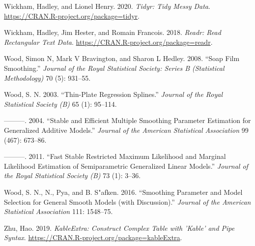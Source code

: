 \documentclass[conference,final,]{IEEEtran}
\newlength{\cslhangindent}
\newenvironment{cslreferences}%
  {\setlength{\parindent}{0pt}%
  \everypar{\setlength{\hangindent}{\cslhangindent}}\ignorespaces}%
  {\par}
\begin{document}
\begin{cslreferences}
\leavevmode\hypertarget{ref-R-tidyr}{}%
Wickham, Hadley, and Lionel Henry. 2020. \emph{Tidyr: Tidy Messy Data}. \url{https://CRAN.R-project.org/package=tidyr}.

\leavevmode\hypertarget{ref-R-readr}{}%
Wickham, Hadley, Jim Hester, and Romain Francois. 2018. \emph{Readr: Read Rectangular Text Data}. \url{https://CRAN.R-project.org/package=readr}.

\leavevmode\hypertarget{ref-wood2008soap}{}%
Wood, Simon N, Mark V Bravington, and Sharon L Hedley. 2008. ``Soap Film Smoothing.'' \emph{Journal of the Royal Statistical Society: Series B (Statistical Methodology)} 70 (5): 931--55.

\leavevmode\hypertarget{ref-R-mgcv_d}{}%
Wood, S. N. 2003. ``Thin-Plate Regression Splines.'' \emph{Journal of the Royal Statistical Society (B)} 65 (1): 95--114.

\leavevmode\hypertarget{ref-R-mgcv_c}{}%
---------. 2004. ``Stable and Efficient Multiple Smoothing Parameter Estimation for Generalized Additive Models.'' \emph{Journal of the American Statistical Association} 99 (467): 673--86.

\leavevmode\hypertarget{ref-R-mgcv_a}{}%
---------. 2011. ``Fast Stable Restricted Maximum Likelihood and Marginal Likelihood Estimation of Semiparametric Generalized Linear Models.'' \emph{Journal of the Royal Statistical Society (B)} 73 (1): 3--36.

\leavevmode\hypertarget{ref-R-mgcv_b}{}%
Wood, S. N., N., Pya, and B. S"afken. 2016. ``Smoothing Parameter and Model Selection for General Smooth Models (with Discussion).'' \emph{Journal of the American Statistical Association} 111: 1548--75.

\leavevmode\hypertarget{ref-R-kableExtra}{}%
Zhu, Hao. 2019. \emph{KableExtra: Construct Complex Table with 'Kable' and Pipe Syntax}. \url{https://CRAN.R-project.org/package=kableExtra}.
\end{cslreferences}
\end{document}
